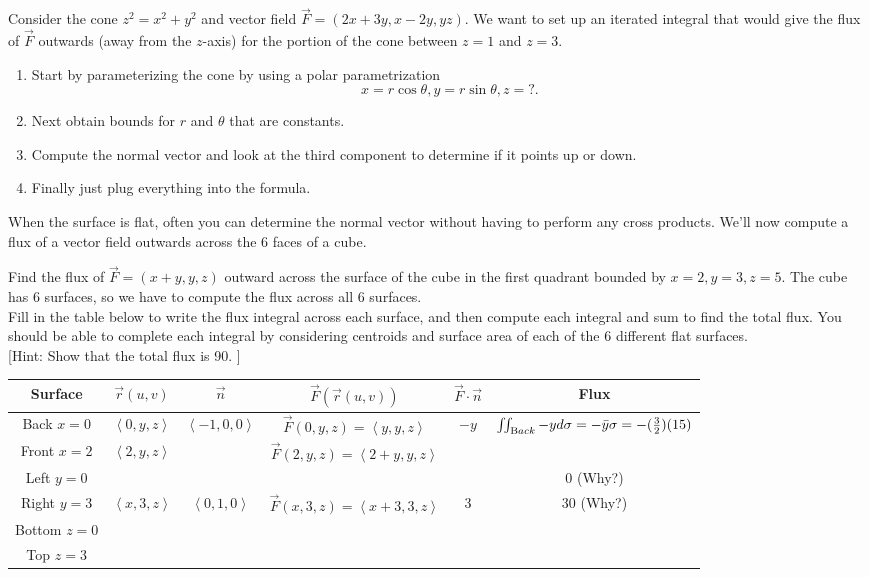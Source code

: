\begin{problem}
 Consider the cone $z^2=x^2+y^2$ and vector field $\vec F = (2x+3y, x-2y, yz)$. We want to set up an iterated integral that would give the flux of $\vec F$ outwards (away from the $z$-axis) for the portion of the cone between $z=1$ and $z=3$. 
\begin{enumerate}
	\item Start by  parameterizing the cone by using a polar parametrization $$x=r\cos\theta, y=r\sin\theta, z=?.$$ 
	\item Next obtain bounds for $r$ and $\theta$ that are constants.  
	\item Compute the normal vector and look at the third component to determine if it points up or down.  
	\item Finally just plug everything into the formula.
\end{enumerate}
\end{problem}


When the surface is flat, often you can determine the normal vector without having to perform any cross products.  We'll now compute a flux of a vector field outwards across the 6 faces of a cube. 

\begin{problem}\label{boxflux} 

Find the flux of $ \vec F=(x+y,y,z) $ outward across the surface of the cube in the first quadrant bounded by {$ x=2,y=3,z=5 $}. The cube has 6 surfaces, so we have to compute the flux across all 6 surfaces. \\

Fill in the table below to write the flux integral across each surface, and then compute each integral and sum to find the total flux. You should be able to complete each integral by considering centroids and surface area of each of the 6 different flat surfaces. \\

[Hint: Show that the total flux is 90. ]
\begin{center}
\begin{tabular}{|c|c|c|c|c|c|}
\hline
Surface&$\vec r(u,v)$ & $\vec n$ & $\vec F(\vec r(u,v))$ & $\vec F\cdot \vec n$  & Flux\\\hline
Back $x=0$&$ \left<0,y,z\right>$   & $ \left<-1,0,0\right>$ & $\vec F(0,y,z) = \left<y,y,z\right>$ & $-y$&  $\iint_{\text Back} -y d\sigma = -\bar y \sigma=-(\frac{3}{2})(15)$\\\hline
Front $x=2$& $ \left<2,y,z\right>$ &  & $\vec F(2,y,z) = \left<2+y,y,z\right>$ &  & \\\hline
Left $y=0$&     & &  & &  $0$ (Why?)\\\hline
Right $y=3$&   $ \left<x,3,z\right>$      & $ \left<0,1,0\right>$  & $\vec F(x,3,z) = \left<x+3,3,z\right>$ & 3 & 30 (Why?) \\\hline
Bottom $z=0$&     & &  & & \\\hline
Top $z=3$&    & &  & & \\\hline
\end{tabular} 
\end{center}

\end{problem}

